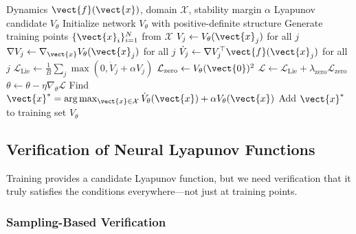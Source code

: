 \begin{algorithm}[H]
\caption{Neural Lyapunov Function Learning}
\label{alg:neural_lyapunov}
\begin{algorithmic}[1]
\REQUIRE Dynamics $\vect{f}(\vect{x})$, domain $\mathcal{X}$, stability margin $\alpha$
\ENSURE Lyapunov candidate $V_\theta$
\STATE Initialize network $V_\theta$ with positive-definite structure
\STATE Generate training points $\{\vect{x}_i\}_{i=1}^{N}$ from $\mathcal{X}$
\STATE
{}
        \STATE {}
        \STATE $V_j \gets V_\theta(\vect{x}_j)$ for all $j$
        \STATE
        \STATE {}
        \STATE $\nabla V_j \gets \nabla_{\vect{x}} V_\theta(\vect{x}_j)$ for all $j$
        \STATE $\dot{V}_j \gets \nabla V_j^\top \vect{f}(\vect{x}_j)$ for all $j$
        \STATE
        \STATE {}
        \STATE $\mathcal{L}_{\text{Lie}} \gets \frac{1}{B}\sum_j \max(0, \dot{V}_j + \alpha V_j)$
        \STATE $\mathcal{L}_{\text{zero}} \gets V_\theta(\vect{0})^2$
        \STATE $\mathcal{L} \gets \mathcal{L}_{\text{Lie}} + \lambda_{\text{zero}} \mathcal{L}_{\text{zero}}$
        \STATE
        \STATE $\theta \gets \theta - \eta \nabla_\theta \mathcal{L}$
    \ENDFOR
    \STATE
    \STATE {}
        \STATE Find $\vect{x}^* = \arg\max_{\vect{x} \in \mathcal{X}} \dot{V}_\theta(\vect{x}) + \alpha V_\theta(\vect{x})$
            \STATE Add $\vect{x}^*$ to training set
        \ENDIF
    \ENDIF
\ENDFOR
\RETURN $V_\theta$
\end{algorithmic}
\end{algorithm}

\subsection{Verification of Neural Lyapunov Functions}

Training provides a candidate Lyapunov function, but we need verification that it truly satisfies the conditions everywhere---not just at training points.

\subsubsection{Sampling-Based Verification}

